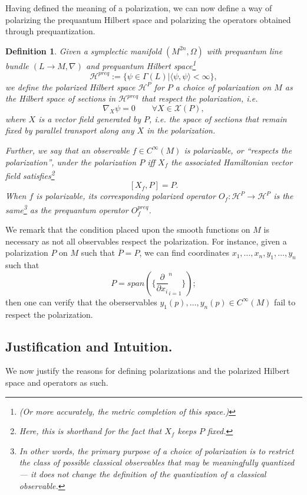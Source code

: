\documentclass{tufte-handout}
\newtheorem{defn}{Definition}
\begin{document}
Having defined the meaning of a polarization, we can now define a way of polarizing the prequantum Hilbert space and polarizing the operators obtained through prequantization.
\begin{defn}
Given a symplectic manifold $(M^{2n},\Omega)$ with prequantum line bundle $(L \to M,\nabla)$ and prequantum Hilbert space\footnote{(Or more accurately, the metric completion of this space.)}
$$
\mathcal{H}^{preq} := \{\psi \in \Gamma(L) | \langle\psi,\psi\rangle < \infty \},
$$
we define the polarized Hilbert space $\mathcal{H}^{P}$ for $P$ a choice of polarization on $M$ as the Hilbert space of sections in $\mathcal{H}^{preq}$ that \emph{respect the polarization}, i.e.
$$
\nabla_X \psi = 0 \qquad \forall X \in \mathcal{X}(P),
$$
where $X$ is a vector field generated by $P$, i.e. the space of sections that remain fixed by parallel transport along any $X$ in the polarization.

Further, we say that an observable $f \in C^\infty(M)$ is \emph{polarizable}, or \emph{``respects the polarization''}, under the polarization $P$ iff $X_f$ the associated Hamiltonian vector field satisfies\footnote{Here, this is shorthand for the fact that $X_f$ keeps $P$ fixed.}
$$
[X_f,P] = P.
$$
When $f$ is polarizable, its corresponding \emph{polarized operator} $O_f: \mathcal{H}^{P} \to \mathcal{H}^{P}$ is the same\footnote{In other words, the primary purpose of a choice of polarization is to restrict the class of possible classical observables that may be meaningfully quantized --- it does not change the definition of the quantization of a classical observable.}
 as the prequantum operator $O^{preq}_f$.

\end{defn}

We remark that the condition placed upon the smooth functions on $M$ is necessary as not all observables respect the polarization. For instance, given a polarization $P$ on $M$ such that $\overline{P} = P$, we can find coordinates $x_1,\ldots,x_n,y_1,\ldots,y_n$ such that
$$
P = span(\{\frac{\partial}{\partial x_i}_{i=1}^n\});
$$
then one can verify that the oberservables $y_1(p),\ldots,y_n(p) \in C^\infty(M)$ fail to respect the polarization.


\subsection{Justification and Intuition.}
We now justify the reasons for defining polarizations and the polarized Hilbert space and operators as such.
\end{document}
